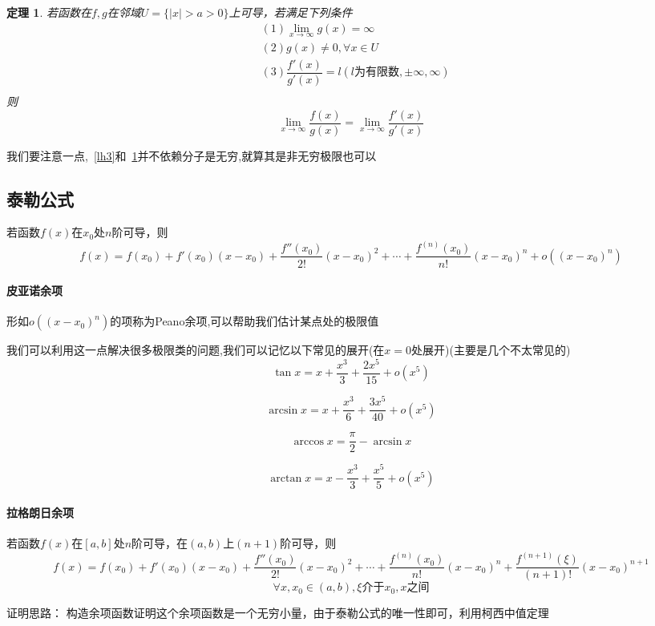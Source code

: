 \documentclass{article}
\newtheorem{theorem}{定理}[subsection]
\begin{document}
\begin{CJK}{UTF8}{gkai}
\begin{theorem}\label{lh4}
若函数在$f,g$在邻域$U = \{|x| > a > 0\}$上可导，若满足下列条件
\[
\begin{aligned}
&(1)\lim_{x\to \infty } g(x) = \infty\\
&(2)g(x) \neq 0 ,\forall x\in U\\
&(3)\dfrac{f'(x)}{g'(x)} = l(l\text{为有限数},\pm\infty,\infty)\\
\end{aligned}
\]
则
\[\lim_{x\to \infty}\dfrac{f(x)}{g(x)}=\lim_{x\to \infty}\dfrac{f'(x)}{g'(x)}\]
\end{theorem}
我们要注意一点,~\ref{lh3}和~\ref{lh4}并不依赖分子是无穷,就算其是非无穷极限也可以\\
\subsection{泰勒公式}
若函数$f(x)$在$x_0$处$n$阶可导，则
\[f(x) = f(x_0) + f'(x_0) (x-x_0) + \dfrac{f''(x_0)}{2 !} (x-x_0)^2 + \cdots + \dfrac{f^{(n)}(x_0)}{n !} (x-x_0)^n +o ((x-x_0)^n)\]
\paragraph{皮亚诺余项\\}
形如$o ((x-x_0)^n)$的项称为Peano余项,可以帮助我们估计某点处的极限值

我们可以利用这一点解决很多极限类的问题,我们可以记忆以下常见的展开(在$x = 0$处展开)(主要是几个不太常见的)
\[\tan  x = x + \dfrac{x^3}{3} + \dfrac{2x^5}{15} + o(x^5) \]

\[\arcsin x = x + \dfrac{x^3}{6} + \dfrac{3x^5}{40} + o(x^5)\]

\[\arccos x = \dfrac{\pi}{2} - \arcsin x\]

\[\arctan x = x - \dfrac{x^3}{3} + \dfrac{x^5}{5} + o(x^5)\]

\paragraph{拉格朗日余项}
若函数$f(x)$在$[a,b]$处$n$阶可导，在$(a,b)$上$(n+1)$阶可导，则
\[f(x) = f(x_0) + f'(x_0) (x-x_0) + \dfrac{f''(x_0)}{2 !} (x-x_0)^2 + \cdots + \dfrac{f^{(n)}(x_0)}{n !} (x-x_0)^n + \dfrac{f^{(n+1)}(\xi)}{(n+1) !} (x-x_0)^{n+1}\]
\[\forall x,x_0\in (a,b),\xi\text{介于}x_0,x\text{之间}\]

证明思路： 构造余项函数证明这个余项函数是一个无穷小量，由于泰勒公式的唯一性即可，利用柯西中值定理\\


\end{CJK}
\end{document}
